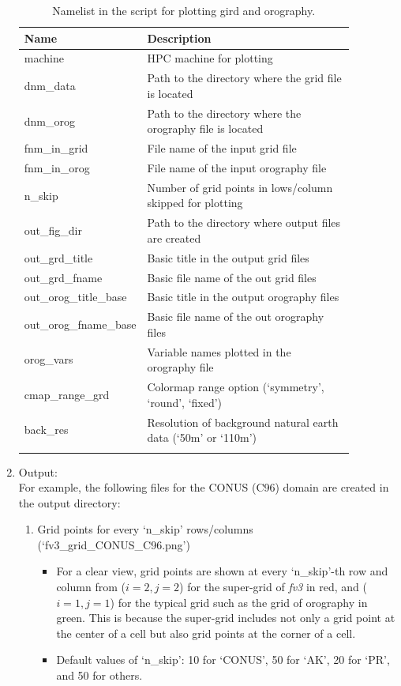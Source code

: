 \documentclass[11pt,fleqn]{report}              %
\begin{document}
\begin{enumerate}
{
\fontsize{10}{12}\selectfont
\begin{longtable}{p{0.22\linewidth} | p{0.65\linewidth} }
\hline
\hline
 Name & Description \\
\hline
 machine & HPC machine for plotting \\
 dnm\_data & Path to the directory where the grid file is located   \\
 dnm\_orog & Path to the directory where the orography file is located \\
 fnm\_in\_grid & File name of the input grid file \\
 fnm\_in\_orog & File name of the input orography file \\
 n\_skip & Number of grid points in lows/column skipped for plotting \\
 out\_fig\_dir & Path to the directory where output files are created \\
 out\_grd\_title & Basic title in the output grid files \\
 out\_grd\_fname & Basic file name of the out grid files \\
 out\_orog\_title\_base & Basic title in the output orography files \\
 out\_orog\_fname\_base & Basic file name of the out orography files \\
 orog\_vars & Variable names plotted in the orography file \\
 cmap\_range\_grd & Colormap range option (`symmetry', `round', `fixed') \\
 back\_res & Resolution of background natural earth data (`50m' or `110m') \\
\hline
\caption{Namelist in the script for plotting gird and orography.}
\label{table:fv3_var_grid_oro}
\end{longtable}
}

\item Output: \\
For example, the following files for the CONUS (C96) domain are created in the output directory:
\begin{enumerate}
\item Grid points for every `n\_skip' rows/columns (`fv3\_grid\_CONUS\_C96.png')
\begin{itemize}
\item For a clear view, grid points are shown at every `n\_skip'-th row and column from ($i=2,j=2$) for the super-grid of {\it fv3} in red, and ($i=1,j=1$) for the typical grid such as the grid of orography in green. This is because the super-grid includes not only a grid point at the center of a cell but also grid points at the corner of a cell.
\item Default values of `n\_skip': 10 for `CONUS', 50 for `AK', 20 for `PR', and 50 for others. 
\end{itemize}



\end{enumerate}
\end{enumerate}
\end{document}
